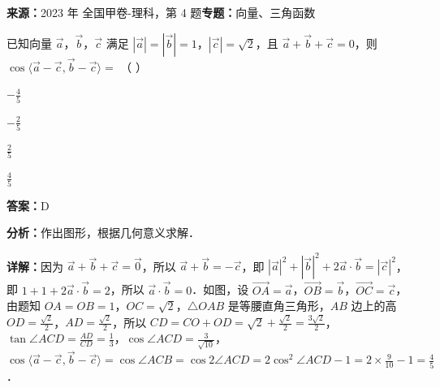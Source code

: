 \begin{question}[points=5]
\textbf{来源：}2023 年 全国甲卷-理科，第 4 题\quad \textbf{专题：}向量、三角函数\par
已知向量 $\vec{a}$，$\vec{b}$，$\vec{c}$ 满足 $|\vec{a}| = |\vec{b}| = 1$，$|\vec{c}| = \sqrt{2}$，且 $\vec{a} + \vec{b} + \vec{c} = 0$，则 $\cos\langle \vec{a} - \vec{c}, \vec{b} - \vec{c} \rangle = $ （               ）
\begin{choices}
  \item $-\frac{4}{5}$
  \item $-\frac{2}{5}$
  \item $\frac{2}{5}$
  \item $\frac{4}{5}$
\end{choices}
\begin{solution}
\textbf{答案：}D

\textbf{分析：}作出图形，根据几何意义求解．

\textbf{详解：}因为 $\vec{a} + \vec{b} + \vec{c} = \vec{0}$，所以 $\vec{a} + \vec{b} = -\vec{c}$，即 $|\vec{a}|^2 + |\vec{b}|^2 + 2\vec{a} \cdot \vec{b} = |\vec{c}|^2$，即 $1 + 1 + 2\vec{a} \cdot \vec{b} = 2$，所以 $\vec{a} \cdot \vec{b} = 0$．如图，设 $\overrightarrow{OA} = \vec{a}$，$\overrightarrow{OB} = \vec{b}$，$\overrightarrow{OC} = \vec{c}$，由题知 $OA = OB = 1$，$OC = \sqrt{2}$，$\triangle OAB$ 是等腰直角三角形，$AB$ 边上的高 $OD = \frac{\sqrt{2}}{2}$，$AD = \frac{\sqrt{2}}{2}$，所以 $CD = CO + OD = \sqrt{2} + \frac{\sqrt{2}}{2} = \frac{3\sqrt{2}}{2}$，$\tan \angle ACD = \frac{AD}{CD} = \frac{1}{3}$，$\cos \angle ACD = \frac{3}{\sqrt{10}}$，$\cos\langle \vec{a} - \vec{c}, \vec{b} - \vec{c} \rangle = \cos \angle ACB = \cos 2\angle ACD = 2\cos^2 \angle ACD - 1 = 2 \times \frac{9}{10} - 1 = \frac{4}{5}$．
\end{solution}
\end{question}

